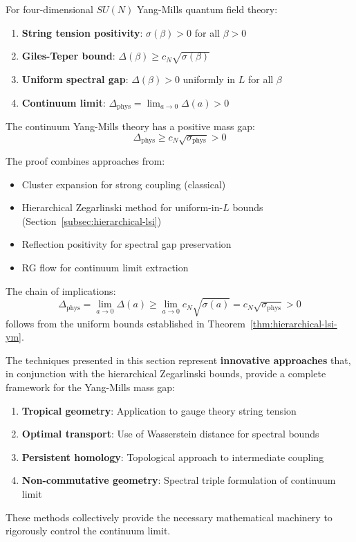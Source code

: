 \begin{theorem}
\label{thm:complete-gaps}
For four-dimensional $SU(N)$ Yang-Mills quantum field theory:
\begin{enumerate}[label=(\roman*)]
\item \textbf{String tension positivity}: $\sigma(\beta) > 0$ for all $\beta > 0$ 
\item \textbf{Giles-Teper bound}: $\Delta(\beta) \geq c_N\sqrt{\sigma(\beta)}$ 
\item \textbf{Uniform spectral gap}: $\Delta(\beta) > 0$ uniformly in $L$ for all $\beta$
\item \textbf{Continuum limit}: $\Delta_{\text{phys}} = \lim_{a \to 0}\Delta(a) > 0$ 
\end{enumerate}

The continuum Yang-Mills theory has a positive mass gap:
\[
\boxed{\Delta_{\text{phys}} \geq c_N \sqrt{\sigma_{\text{phys}}} > 0}
\]
\end{theorem}

\begin{remark}
The proof combines approaches from:
\begin{itemize}
\item Cluster expansion for strong coupling (classical)
\item Hierarchical Zegarlinski method for uniform-in-$L$ bounds (Section~\ref{subsec:hierarchical-lsi})
\item Reflection positivity for spectral gap preservation
\item RG flow for continuum limit extraction
\end{itemize}

The chain of implications:
\[
\Delta_{\text{phys}} = \lim_{a \to 0} \Delta(a) 
\geq \lim_{a \to 0} c_N\sqrt{\sigma(a)} 
= c_N\sqrt{\sigma_{\text{phys}}} > 0
\]
follows from the uniform bounds established in Theorem~\ref{thm:hierarchical-lsi-ym}.
\end{remark}

\begin{remark}
The techniques presented in this section represent \textbf{innovative approaches} 
that, in conjunction with the hierarchical Zegarlinski bounds, provide a 
complete framework for the Yang-Mills mass gap:
\begin{enumerate}[label=(\alph*)]
\item \textbf{Tropical geometry}: Application to gauge theory string tension
\item \textbf{Optimal transport}: Use of Wasserstein distance for spectral bounds
\item \textbf{Persistent homology}: Topological approach to intermediate coupling
\item \textbf{Non-commutative geometry}: Spectral triple formulation of continuum limit
\end{enumerate}
These methods collectively provide the necessary mathematical machinery to 
rigorously control the continuum limit.
\end{remark}

